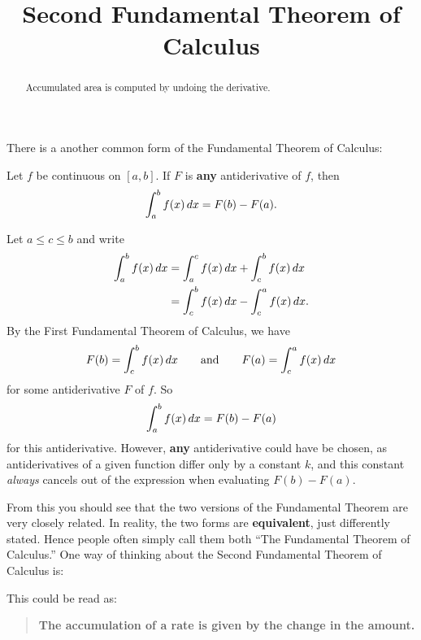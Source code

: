 \documentclass{ximera}
\title[Dig-In:]{Second Fundamental Theorem of Calculus}
\begin{document}
\begin{abstract}
Accumulated area is computed by undoing the derivative. 
\end{abstract}
\maketitle




There is a another common form of the Fundamental Theorem of Calculus:

\begin{theorem}
  Let $f$ be continuous on $[a,b]$. If $F$ is \textbf{any}
  antiderivative of $f$, then
  \[
  \int_a^b f(x)\,d x = F(b)-F(a).
  \]
  \begin{explanation}
    Let $a\le c\le b$ and write
    \begin{align*}
      \int_a^b f(x) \,d x &= \int_a^c f(x) \,d x + \int_c^b f(x) \,d x \\
      &= \int_c^b f(x) \,d x - \int_c^a f(x) \,d x.
    \end{align*}
    By the First Fundamental Theorem of Calculus, we have
    \[
    F(b) = \int_c^b f(x) \,d x\qquad\text{and}\qquad F(a) = \int_c^a f(x) \,d x
    \] 
    for some antiderivative $F$ of $f$. So
    \[
    \int_a^b f(x) \,d x = F(b)-F(a)
    \]
    for this antiderivative. However, \textbf{any} antiderivative
    could have be chosen, as antiderivatives of a given function
    differ only by a constant $k$, and this constant \textit{always}
    cancels out of the expression when evaluating $F(b)-F(a)$.
\end{explanation}
\end{theorem}

From this you should see that the two versions of the Fundamental
Theorem are very closely related. In reality, the two forms are
\textbf{equivalent}, just differently stated. Hence people often
simply call them both ``The Fundamental Theorem of Calculus.''
One way of thinking about the Second Fundamental Theorem of Calculus is:
\begin{center}
\end{center}
This could be read as:%
\begin{quote}\large\textbf{The \textcolor{green!70!black!70!blue}{accumulation} of a \textcolor{blue!70!green}{rate} is given by the \textcolor{purple!50!blue!90!black}{change in the amount}.}
\end{quote}
\end{document}
